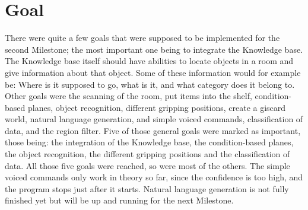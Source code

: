 \documentclass[main.tex]{subfiles}
\begin{document}
	
    \chapter{Goal}
		
    There were quite a few goals that were supposed to be implemented for the second Milestone; the most important one being to integrate the Knowledge base. The Knowledge base itself should have abilities to locate objects in a room and give information about that object. Some of these information would for example be: Where is it supposed to go, what is it, and what category does it belong to.
    Other goals were the scanning of the room, put items into the shelf, condition-based planes, object recognition, different gripping positions, create a giscard world, natural language generation, and simple voiced commands, classification of data, and the region filter. 
    Five of those general goals were marked as important, those being: the integration of the Knowledge base, the condition-based planes, the object recognition, the different gripping positions and the classification of data. All those five goals were reached, so were most of the others. The simple voiced commands only work in theory so far, since the confidence is too high, and the program stops just after it starts. Natural language generation is not fully finished yet but will be up and running for the next Milestone.
    
\end{document}
